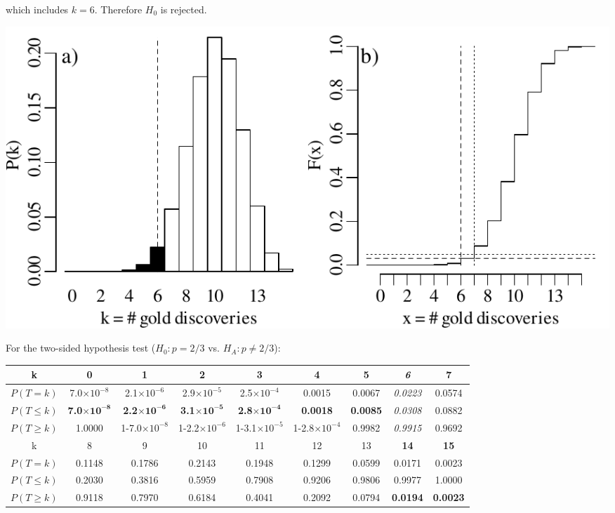 \noindent which includes $k=6$. Therefore $H_0$ is rejected.

\noindent\begin{minipage}[t][][b]{.6\textwidth}
\includegraphics[]{../figures/1sidedbinomialrejection15.pdf}
\medskip
\end{minipage}
\begin{minipage}[t][][t]{.4\textwidth}
  \label{fig:1sidedbinomialrejection15}
\end{minipage}

For the two-sided hypothesis test ($H_0: p={2/3}$ vs. $H_{\!A}:
p\neq{2/3}$):

\begin{center}
\begin{tabular}{c@{\gap}c@{\gap}c@{\gap}c@{\gap}c@{\gap}c@{\gap}c@{\gap}c@{\gap}c}
    k & \textbf{0} & \textbf{1} & \textbf{2} & \textbf{3} & \textbf{4}
    & \textbf{5} & \textit{6} & 7 \\ \hline $P(T=k)$ &
    7.0$\times{10}^{-8}$ & 2.1$\times{10}^{-6}$ & 2.9$\times{10}^{-5}$
    & 2.5$\times{10}^{-4}$ & 0.0015 & 0.0067 & \textit{0.0223} & 0.0574 \\
    $P({T}\leq{k})$ & \textbf{7.0}$\mathbf{\times{10}^{-8}}$ &
    \textbf{2.2}$\mathbf{\times{10}^{-6}}$ &
    \textbf{3.1}$\mathbf{\times{10}^{-5}}$ &
    \textbf{2.8}$\mathbf{\times{10}^{-4}}$ & \textbf{0.0018} &
    \textbf{0.0085} & \textit{0.0308} & 0.0882 \\
    $P({T}\geq{k})$ & 1.0000 &
    1-7.0$\times{10}^{-8}$ & 1-2.2$\times{10}^{-6}$ &
    1-3.1$\times{10}^{-5}$ & 1-2.8$\times{10}^{-4}$ & 0.9982 & \textit{0.9915}
    & 0.9692 \\ k & 8 & 9 & 10 & 11 & 12 & 13 & \textbf{14} & \textbf{15} \\ \hline
    $P(T=k)$ & 0.1148 & 0.1786 & 0.2143 & 0.1948
    & 0.1299 & 0.0599 & 0.0171 & 0.0023 \\
    $P({T}\leq{k})$ & 0.2030 &
    0.3816 & 0.5959 & 0.7908 & 0.9206 & 0.9806 & 0.9977 & 1.0000 \\
    $P({T}\geq{k})$ & 0.9118 & 0.7970 & 0.6184 & 0.4041 & 0.2092 &
    0.0794 & \textbf{0.0194} & \textbf{0.0023}
\end{tabular}
\end{center}

